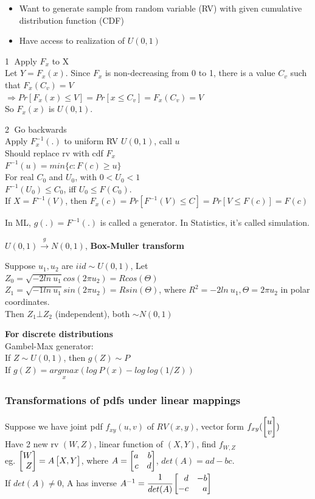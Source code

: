 \documentclass[12pt,a4paper]{article}
\begin{document}
\begin{itemize}
\item Want to generate sample from random variable (RV) with given cumulative distribution function (CDF)
\item Have access to realization of $U(0,1)$
\end{itemize}

\textcircled{1} Apply $F_x$ to X\\
Let $Y=F_x(x)$. Since $F_x$ is non-decreasing from 0 to 1, there is a value $C_v$ such that $F_x(C_v)=V$\\ 
$\Rightarrow Pr[F_x(x)\le V]=Pr[x\le C_v]=F_x(C_v)=V$\\
So $F_x(x)$ is $U(0, 1)$.

\textcircled{2} Go backwards \\
Apply $F_x^{-1}(.)$ to uniform RV $U(0,1)$, call $u$\\
Should replace rv with cdf $F_x$\\
$F^{-1}(u)=min\{c:F(c)\geq u\}$\\
For real $C_0$ and $U_0$, with $0<U_0<1$\\
$F^{-1}(U_0)\le C_0$, iff $U_0\le F(C_0)$. \\
If $X=F^{-1}(V)$, then $F_x(c)=Pr[F^{-1}(V)\le C]=Pr[V\le F(c)]=F(c)$

In ML, $g(.)=F^{-1}(.)$ is called a generator. In Statistics, it's called simulation.

\vspace{0.5cm}
$U(0,1)\overset{g}{\rightarrow}N(0,1)$, \textbf{Box-Muller transform}

Suppose $u_1, u_2$ are $iid\sim U(0,1)$, Let\\
$Z_0=\sqrt{-2ln\ u_1}cos(2\pi u_2)=Rcos(\Theta)$ \\
$Z_1=\sqrt{-1ln\ u_1}sin(2\pi u_2)=Rsin(\Theta)$, where $R^2=-2ln\ u_1, \Theta=2\pi u_2$ in polar coordinates. \\
Then $Z_1\bot Z_2$ (independent), both $\sim N(0,1)$

\vspace{0.5cm}
\textbf{For discrete distributions}\\
Gambel-Max generator: \\
If $Z\sim U(0,1)$, then $g(Z)\sim P$\\
If $g(Z) = \underset{x}{argmax}(log\ P(x)-log\ log(1/Z))$\\

\subsubsection{Transformations of pdfs under linear mappings}
Suppose we have joint pdf $f_{xy}(u,v)$ of $RV(x,y)$, vector form $f_{xy}(\vecb{u\\v})$ \\
Have 2 new rv $(W, Z)$, linear function of $(X,Y)$, find $f_{W,Z}$\\ 
eg. $\vecb{W\\Z}=A\vecb{X,Y}$, where $A=\vecb{a&b\\c&d}$, $det(A)=ad-bc$.\\ 
If $det(A)\neq 0$, A has inverse $A^{-1}=\cfrac{1}{det(A)}\vecb{d&-b\\-c&a}$
\end{document}
